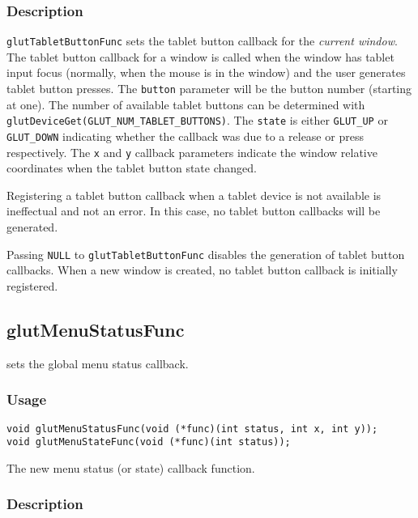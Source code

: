 \subsubsection*{Description}

{\tt glutTabletButtonFunc} sets the tablet button callback for the {\em
current window}.  The tablet button callback for a window is called when the
window has tablet input focus (normally, when the mouse is in the window)
and the user generates tablet button presses.  The {\tt button} parameter
will be the button number (starting at one).  The number of available tablet
buttons can be determined with {\tt glutDeviceGet(GLUT\_NUM\_TABLET\_BUTTONS)}.
The {\tt state} is either {\tt GLUT\_UP} or {\tt GLUT\_DOWN} indicating whether
the callback was due to a release or press respectively.
The {\tt x} and {\tt y} callback
parameters indicate the window relative coordinates when the tablet
button state changed.

Registering a tablet button callback when a tablet device is not available
is ineffectual and not an error.  In this case, no tablet button callbacks
will be generated.

Passing {\tt NULL} to {\tt glutTabletButtonFunc} disables the generation of
tablet button callbacks.  When a new window is created, no
tablet button callback is initially registered.

\subsection{glutMenuStatusFunc}

 sets the global menu status callback.

\subsubsection*{Usage}
\begin{verbatim}
void glutMenuStatusFunc(void (*func)(int status, int x, int y));
void glutMenuStateFunc(void (*func)(int status));
\end{verbatim}
\begin{description}
\itemsep 0in
\item[{\tt func}]
The new menu status (or state) callback function.
\end{description}

\subsubsection*{Description}

